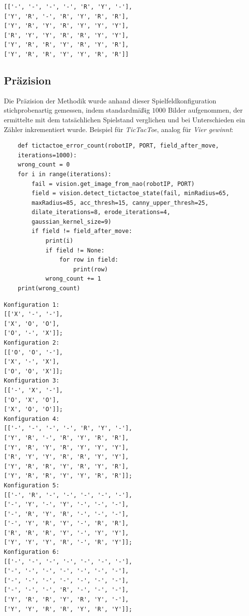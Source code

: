 \begin{verbatim}
[['-', '-', '-', '-', 'R', 'Y', '-'],
['Y', 'R', '-', 'R', 'Y', 'R', 'R'],
['Y', 'R', 'Y', 'R', 'Y', 'Y', 'Y'],
['R', 'Y', 'Y', 'R', 'R', 'Y', 'Y'],
['Y', 'R', 'R', 'Y', 'R', 'Y', 'R'],
['Y', 'R', 'R', 'Y', 'Y', 'R', 'R']]
\end{verbatim}   

\subsection{Präzision}

Die Präzision der Methodik wurde anhand dieser Spielfeldkonfiguration stichprobenartig gemessen, indem standardmäßig $1000$ Bilder aufgenommen, der ermittelte mit dem tatsächlichen Spielstand verglichen und bei Unterschieden ein Zähler inkrementiert wurde. Beispiel für \textit{TicTacToe}, analog für \textit{Vier gewinnt}:

\begin{verbatim}
    def tictactoe_error_count(robotIP, PORT, field_after_move,
    iterations=1000):
    wrong_count = 0
    for i in range(iterations):
        fail = vision.get_image_from_nao(robotIP, PORT)
        field = vision.detect_tictactoe_state(fail, minRadius=65, 
        maxRadius=85, acc_thresh=15, canny_upper_thresh=25, 
        dilate_iterations=8, erode_iterations=4, 
        gaussian_kernel_size=9)
        if field != field_after_move:
            print(i)
            if field != None:
                for row in field:
                    print(row)
            wrong_count += 1
    print(wrong_count)
\end{verbatim}


\begin{verbatim}
Konfiguration 1:
[['X', '-', '-'],
['X', 'O', 'O'],
['O', '-', 'X']];
Konfiguration 2:
[['O', 'O', '-'],
['X', '-', 'X'],
['O', 'O', 'X']];
Konfiguration 3:
[['-', 'X', '-'],
['O', 'X', 'O'],
['X', 'O', 'O']];
Konfiguration 4:
[['-', '-', '-', '-', 'R', 'Y', '-'],
['Y', 'R', '-', 'R', 'Y', 'R', 'R'],
['Y', 'R', 'Y', 'R', 'Y', 'Y', 'Y'],
['R', 'Y', 'Y', 'R', 'R', 'Y', 'Y'],
['Y', 'R', 'R', 'Y', 'R', 'Y', 'R'],
['Y', 'R', 'R', 'Y', 'Y', 'R', 'R']];
Konfiguration 5:
[['-', 'R', '-', '-', '-', '-', '-'],
['-', 'Y', '-', 'Y', '-', '-', '-'],
['-', 'R', 'Y', 'R', '-', '-', '-'],
['-', 'Y', 'R', 'Y', '-', 'R', 'R'],
['R', 'R', 'R', 'Y', '-', 'Y', 'Y'],
['Y', 'Y', 'Y', 'R', '-', 'R', 'Y']];
Konfiguration 6:
[['-', '-', '-', '-', '-', '-', '-'],
['-', '-', '-', '-', '-', '-', '-'],
['-', '-', '-', '-', '-', '-', '-'],
['-', '-', '-', 'R', '-', '-', '-'],
['Y', 'R', 'R', 'Y', 'R', 'Y', '-'],
['Y', 'Y', 'R', 'R', 'Y', 'R', 'Y']];
\end{verbatim}

